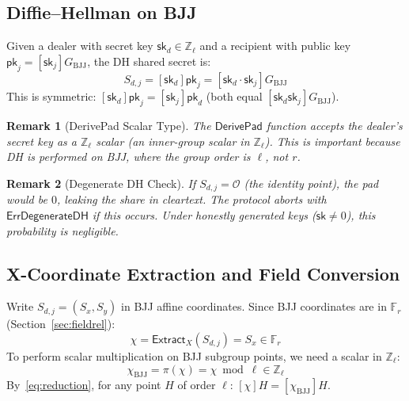 \documentclass[11pt,a4paper]{article}
\newtheorem{remark}{Remark}[section]
\newcommand{\F}{\mathbb{F}}
\newcommand{\Z}{\mathbb{Z}}
\newcommand{\Fr}{\F_r}
\newcommand{\Fl}{\Z_\ell}
\newcommand{\genbjj}{G_{\mathrm{BJJ}}}
\newcommand{\sk}{\mathsf{sk}}
\newcommand{\pk}{\mathsf{pk}}
\newcommand{\Extract}{\mathsf{Extract}_X}
\newcommand{\dhx}{\chi}
\begin{document}
\subsection{Diffie--Hellman on BJJ}
\label{sec:dh}

Given a dealer with secret key $\sk_d \in \Fl$ and a recipient with public key
$\pk_j = [\sk_j]\genbjj$, the DH shared secret is:
\begin{equation}
  S_{d,j} = [\sk_d]\pk_j = [\sk_d \cdot \sk_j]\genbjj
  \label{eq:dh}
\end{equation}
This is symmetric: $[\sk_d]\pk_j = [\sk_j]\pk_d$ (both equal
$[\sk_d \sk_j]\genbjj$).

\begin{remark}[DerivePad Scalar Type]
  The $\mathsf{DerivePad}$ function accepts the dealer's secret key as a
  $\Fl$ scalar (an inner-group scalar in $\Z_\ell$). This is important because
  DH is performed on BJJ, where the group order is $\ell$, not $r$.
\end{remark}

\begin{remark}[Degenerate DH Check]
  If $S_{d,j} = \mathcal{O}$ (the identity point), the pad would be $0$,
  leaking the share in cleartext. The protocol aborts with
  $\mathsf{ErrDegenerateDH}$ if this occurs. Under honestly generated keys
  ($\sk \ne 0$), this probability is negligible.
\end{remark}

\subsection{X-Coordinate Extraction and Field Conversion}
\label{sec:xextract}

Write $S_{d,j} = (S_x, S_y)$ in BJJ affine coordinates. Since BJJ coordinates
are in $\Fr$ (Section~\ref{sec:fieldrel}):
\begin{equation}
  \dhx = \Extract(S_{d,j}) = S_x \in \Fr
  \label{eq:extract}
\end{equation}
To perform scalar multiplication on BJJ subgroup points, we need a scalar in
$\Fl$:
\begin{equation}
  \dhx_{\mathrm{BJJ}} = \pi(\dhx) = \dhx \bmod \ell \in \Fl
  \label{eq:sbjj}
\end{equation}
By~\eqref{eq:reduction}, for any point $H$ of order $\ell$:
$[\dhx]H = [\dhx_{\mathrm{BJJ}}]H$.
\end{document}
